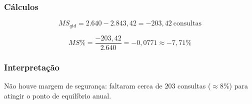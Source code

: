 \documentclass[12pt]{article}
\begin{document}
\subsubsection{Cálculos}
\label{sec:org256349f}
\[
MS_{qtd} = 2.640 - 2.843{,}42 = -203{,}42\ \text{consultas}
\]

\[
MS\% = \frac{-203{,}42}{2.640} = -0{,}0771 \approx -7{,}71\%
\]

\subsubsection{Interpretação}
\label{sec:org01aa507}
Não houve margem de segurança: faltaram cerca de \(203\) consultas (\(\approx 8\%\)) para atingir o ponto de equilíbrio anual.
\end{document}
